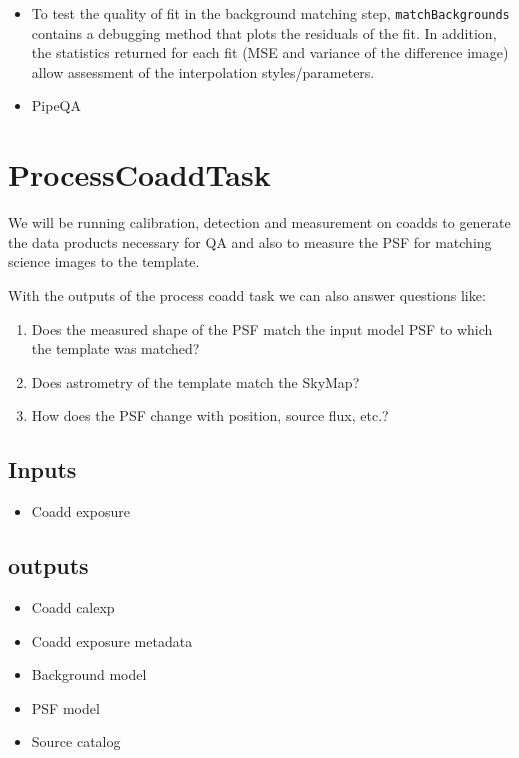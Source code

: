 \documentclass[12pt]{article}
\begin{document}
\begin{itemize}
\item To test the quality of fit in the background matching step, 
{\tt matchBackgrounds} contains a debugging method that plots the residuals of the fit.  In addition, the statistics returned for each fit (MSE and variance of the difference image) allow assessment of the interpolation styles/parameters.
\item PipeQA
\end{itemize}




\clearpage 
\section{ProcessCoaddTask} 
We will be running calibration, detection and measurement on coadds to 
generate the data products necessary for QA and also to measure the PSF
for matching science images to the template.

With the outputs of the process coadd task we can also answer questions like:
\begin{enumerate}
\item Does the measured shape of the PSF match the input model PSF to which the template was matched?
\item Does astrometry of the template match the SkyMap?
\item How does the PSF change with position, source flux, etc.?
\end{enumerate}

\subsection{Inputs}
\begin{itemize}
\item Coadd exposure
\end{itemize}

\subsection{outputs}
\begin{itemize}
\item Coadd calexp
\item Coadd exposure metadata
\item Background model
\item PSF model
\item Source catalog
\end{itemize}
\end{document}
